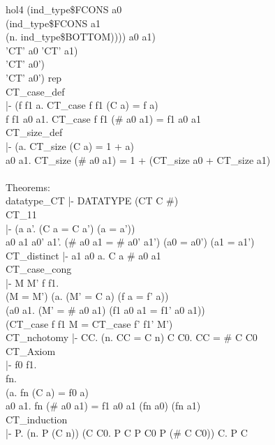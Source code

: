 \begin{GFT}{hol4}
\+                            (ind\_type\$FCONS a0\\
\+                               (ind\_type\$FCONS a1\\
\+                                  (\MMM{\lambda}n. ind\_type\$BOTTOM)))) a0 a1) \MMM{\land}\\
\+                      'CT' a0 \MMM{\land} 'CT' a1) \MMM{\Rightarrow}\\
\+                   'CT' a0') \MMM{\Rightarrow}\\
\+                'CT' a0') rep\\
\+    CT\_case\_def\\
\+    |- (\MMM{\forall}f f1 a. CT\_case f f1 (C a) = f a) \MMM{\land}\\
\+       \MMM{\forall}f f1 a0 a1. CT\_case f f1 (\# a0 a1) = f1 a0 a1\\
\+    CT\_size\_def\\
\+    |- (\MMM{\forall}a. CT\_size (C a) = 1 + a) \MMM{\land}\\
\+       \MMM{\forall}a0 a1. CT\_size (\# a0 a1) = 1 + (CT\_size a0 + CT\_size a1)\\
\+\\
\+Theorems:\\
\+    datatype\_CT  |- DATATYPE (CT C \#)\\
\+    CT\_11\\
\+    |- (\MMM{\forall}a a'. (C a = C a') \MMM{\Leftrightarrow} (a = a')) \MMM{\land}\\
\+       \MMM{\forall}a0 a1 a0' a1'. (\# a0 a1 = \# a0' a1') \MMM{\Leftrightarrow} (a0 = a0') \MMM{\land} (a1 = a1')\\
\+    CT\_distinct  |- \MMM{\forall}a1 a0 a. C a \MMM{\neq} \# a0 a1\\
\+    CT\_case\_cong\\
\+    |- \MMM{\forall}M M' f f1.\\
\+         (M = M') \MMM{\land} (\MMM{\forall}a. (M' = C a) \MMM{\Rightarrow} (f a = f' a)) \MMM{\land}\\
\+         (\MMM{\forall}a0 a1. (M' = \# a0 a1) \MMM{\Rightarrow} (f1 a0 a1 = f1' a0 a1)) \MMM{\Rightarrow}\\
\+         (CT\_case f f1 M = CT\_case f' f1' M')\\
\+    CT\_nchotomy  |- \MMM{\forall}CC. (\MMM{\exists}n. CC = C n) \MMM{\lor} \MMM{\exists}C C0. CC = \# C C0\\
\+    CT\_Axiom\\
\+    |- \MMM{\forall}f0 f1.\\
\+         \MMM{\exists}fn.\\
\+           (\MMM{\forall}a. fn (C a) = f0 a) \MMM{\land}\\
\+           \MMM{\forall}a0 a1. fn (\# a0 a1) = f1 a0 a1 (fn a0) (fn a1)\\
\+    CT\_induction\\
\+    |- \MMM{\forall}P. (\MMM{\forall}n. P (C n)) \MMM{\land} (\MMM{\forall}C C0. P C \MMM{\land} P C0 \MMM{\Rightarrow} P (\# C C0)) \MMM{\Rightarrow} \MMM{\forall}C. P C\\
\end{GFT}

